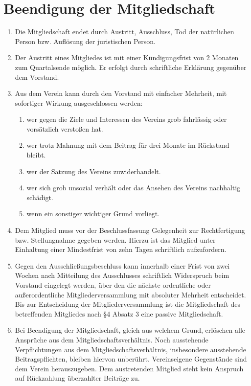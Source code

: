 \documentclass[a4paper,ngerman]{scrartcl}
\begin{document}
\section{Beendigung der Mitgliedschaft}
\begin{enumerate}
\item Die Mitgliedschaft endet durch Austritt, Ausschluss, Tod der natürlichen Person bzw. Auflösung der juristischen Person.
\item Der Austritt eines Mitgliedes ist mit einer Kündigungsfrist von 2 Monaten zum Quartalsende möglich. Er erfolgt durch schriftliche Erklärung gegenüber dem Vorstand.
\item Aus dem Verein kann durch den Vorstand mit einfacher Mehrheit, mit sofortiger Wirkung ausgeschlossen werden: 
\begin{enumerate}
\item wer gegen die Ziele und Interessen des Vereins grob fahrlässig oder vorsätzlich verstoßen hat. 
\item wer trotz Mahnung mit dem Beitrag für drei Monate im Rückstand bleibt.
\item wer der Satzung des Vereins zuwiderhandelt.
\item wer sich grob unsozial verhält oder das Ansehen des Vereins nachhaltig schädigt.
\item wenn ein sonstiger wichtiger Grund vorliegt.
\end{enumerate}
\item Dem Mitglied muss vor der Beschlussfassung Gelegenheit zur Rechtfertigung bzw. Stellungnahme gegeben werden. Hierzu ist das Mitglied unter Einhaltung einer Mindestfrist von zehn Tagen schriftlich aufzufordern.
\item Gegen den Ausschließungsbeschluss kann innerhalb einer Frist von zwei Wochen nach Mitteilung des Ausschlusses schriftlich Widerspruch beim Vorstand eingelegt werden, über den die nächste ordentliche oder außerordentliche Mitgliederversammlung mit absoluter Mehrheit entscheidet. Bis zur Entscheidung der Mitgliederversammlung ist die Mitgliedschaft des betreffenden Mitgliedes nach §4 Absatz 3 eine passive Mitgliedschaft.
\item Bei Beendigung der Mitgliedschaft, gleich aus welchem Grund, erlöschen alle Ansprüche aus dem Mitgliedschaftsverhältnis. Noch ausstehende Verpflichtungen aus dem Mitgliedschaftsverhältnis, insbesondere ausstehende Beitragspflichten, bleiben hiervon unberührt. Vereinseigene Gegenstände sind dem Verein herauszugeben. 
Dem austretenden Mitglied steht kein Anspruch auf Rückzahlung überzahlter Beiträge zu.
\end{enumerate}
\end{document}
